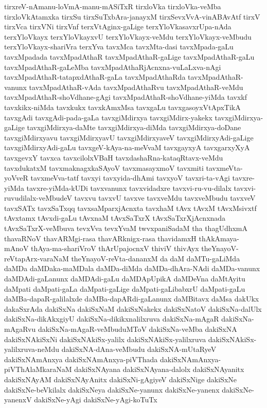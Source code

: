 {tirxreV-nAmanu-loVmA-manu-mASiTxR
tirxloVka
tirxloVka-veMba
tirxloVkAtamxka
tirxSu
tirxSuTxbAra-janayxM
tirxSevxVvA-vinABAvAtf
tirxV
tirxVca
tirxVNi
tirxVnf
terxVtAginx-gaLige
terxYloVkasavxrUpa-nAda
terxYloVkayx
terxYloVkayxvU
terxYloVkayx-veMdu
terxYloVkayx-veMbudu
terxYloVkayx-shariVra
terxYva
tavxMca
tavxMta-dasi
tavxMpada-gaLu
tavxMpadada
tavxMpadAthaR
tavxMpadAthaR-gaLige
tavxMpadAthaR-gaLu
tavxMpadAthaR-gaLeMba
tavxMpadAthaRjAcnxna-vuLaLxva-nAgi
tavxMpadAthaR-tatapxdAthaR-gaLa
tavxMpadAthaRda
tavxMpadAthaR-vanunx
tavxMpadAthaR-vAda
tavxMpadAthaRvu
tavxMpadAthaR-veMdu
tavxMpadAthaR-shoVdhane-gAgi
tavxMpadAthaR-shoVdhane-yiMda
tavxkf
tavxkikx-niMda
tavxkukx
tavxkAmxMsa
tavxgaLu
tavxgasoyxVtApxTikA
tavxgAdi
tavxgAdi-pada-gaLa
tavxgiMdirxya
tavxgiMdirx-yakekx
tavxgiMdirxya-gaLige
tavxgiMdirxya-daMte
tavxgiMdirxya-diMda
tavxgiMdirxya-doDane
tavxgiMdirxyavu
tavxgiMdirxyavU
tavxgiMdirxyaveV
tavxgiMdirxyAdi-gaLige
tavxgiMdirxyAdi-gaLu
tavxgeV-kAya-na-meVvaM
tavxgayxyA
tavxgarxyXyA
tavxgevxY
tavxca
tavxcilolxVBaH
tavxdashaRna-kataqRtavx-veMdu
tavxdukatxM
tavxmaknagxkaSAyoV
tavxmasayxmoV
tavxmiti
tavxmeVta-yoVveR
tavxmeVva-tatf
tavxyi
tavxyida-dhAmi
tavxyoV
tavxri-ta-vAgi
tavxre-yiMda
tavxre-yiMda-kUDi
tavxvanunx
tavxvidadxre
tavxvi-ru-vu-dilalx
tavxvi-ruvudilalx-veMbudeV
tavxvu
tavxvU
tavxve
tavxveMdu
tavxveMbudu
tavxveV
tavxSATx
tavxSaTxqq
tavxsaMparxjAcnxta
tavxhaM
tAvx
tAvxM
tAvxMsivxtf
tAvxtamx
tAvxdi-gaLu
tAvxnaM
tAvxSaTxrX
tAvxSaTxrXjAcnxnada
tAvxSaTxrX-veMbuva
tevxVva
tevxYvaM
twvxpaniSadaM
tha
thagUdhxmA
thavaRNoV
thavARMgi-rasa
thavARknigx-rasa
thavidamxH
thAkAmaya-mAnoV
thAya-ma-shariVroV
thArUpajocnxV
thiviV
thivAyx
theYnayoV-reVtapArx-varaNaM
theYnayoV-reVta-dananxM
da
daM
daMTu-gaLiMda
daMDa
daMDaka-maMDala
daMDa-diMda
daMDa-dhAra-NAdi
daMDa-vanunx
daMDAdi-gaLanunx
daMDAdi-gaLu
daMDApUpikA
daMDeVna
daMtAyitu
daMpati
daMpati-gaLa
daMpati-gaLige
daMpati-gaLibabxrU
daMpati-gaLu
daMBa-dapaR-galilalxde
daMBa-dapARdi-gaLanunx
daMBitavx
daMsa
dakUkx
dakaSxrAda
dakiSxNa
dakiSxNaM
dakiSxNakekx
dakiSxNatoV
dakiSxNa-dalUlx
dakiSxNa-dikAkxgiyU
dakiSxNa-dikikxnalilxruva
dakiSxNa-mAgaR
dakiSxNa-mAgaRvu
dakiSxNa-mAgaR-veMbuduMToV
dakiSxNa-veMba
dakiSxNA
dakiSxNAkiSxNi
dakiSxNAkiSx-yalilx
dakiSxNAkiSx-yalilxruva
dakiSxNAkiSx-yalilxruva-neMdu
dakiSxNA-dAna-veMbudu
dakiSxNA-mUtaRyeV
dakiSxNAmAnxya
dakiSxNAmAnxya-piVThada
dakiSxNAmAnxya-piVThAlaMkaraNaM
dakiSxNAyana
dakiSxNAyana-dalolx
dakiSxNAyanitx
dakiSxNAyAM
dakiSxNAyAnitx
dakiSxNi-gAgiyeV
dakiSxNige
dakiSxNe
dakiSxNe-beVkilalx
dakiSxNeya
dakiSxNe-yanunx
dakiSxNe-yanenx
dakiSxNe-yanenxV
dakiSxNe-yAgi
dakiSxNe-yAgi-koTuTx
}
